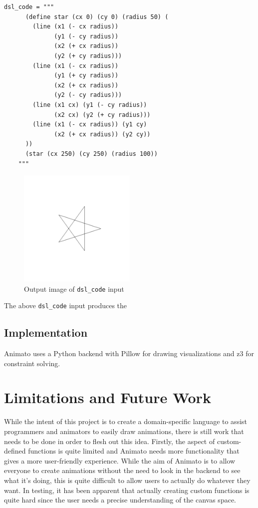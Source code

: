 \documentclass[acmsmall,screen]{acmart}
\begin{document}
\begin{lstlisting}[label=Sample custom function definition in Animato]
    dsl_code = """
      (define star (cx 0) (cy 0) (radius 50) (
        (line (x1 (- cx radius))
              (y1 (- cy radius))
              (x2 (+ cx radius))
              (y2 (+ cy radius)))
        (line (x1 (- cx radius))
              (y1 (+ cy radius))
              (x2 (+ cx radius))
              (y2 (- cy radius)))
        (line (x1 cx) (y1 (- cy radius))
              (x2 cx) (y2 (+ cy radius)))
        (line (x1 (- cx radius)) (y1 cy)
              (x2 (+ cx radius)) (y2 cy))
      ))
      (star (cx 250) (cy 250) (radius 100))
    """
\end{lstlisting}

\begin{center}
  \begin{figure}
    \includegraphics[width=0.5\textwidth]{images/star.png}
    \caption{Output image of \texttt{dsl\_code} input}
  \end{figure}
\end{center}

The above \texttt{dsl\_code} input produces the 

\subsection{Implementation}
Animato uses a Python backend with Pillow for drawing visualizations and z3 for constraint solving.

\section{Limitations and Future Work}
While the intent of this project is to create a domain-specific language to assist programmers and animators to easily draw animations, there is still work that needs to be done in order to flesh out this idea.
Firstly, the aspect of custom-defined functions is quite limited and Animato needs more functionality that gives a more user-friendly experience.
While the aim of Animato is to allow everyone to create animations without the need to look in the backend to see what it's doing, this is quite difficult to allow users to actually do whatever they want.
In testing, it has been apparent that actually creating custom functions is quite hard since the user needs a precise understanding of the canvas space.
\end{document}
